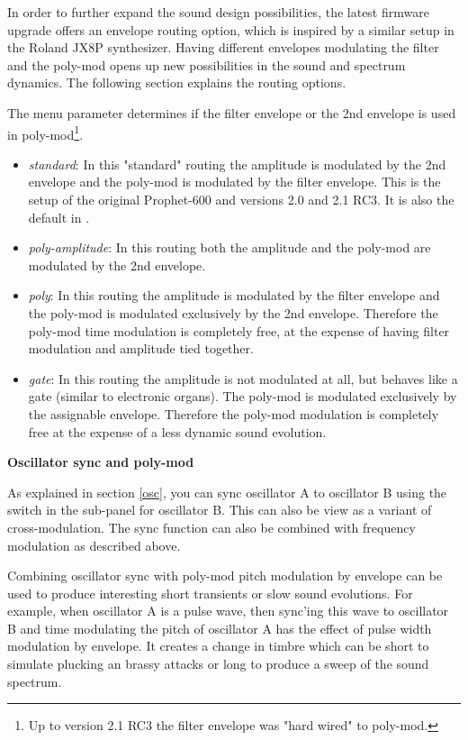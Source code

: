 In order to further expand the sound design possibilities, the latest firmware upgrade offers an envelope routing option, which is inspired by a similar setup in the Roland JX8P synthesizer. Having different envelopes modulating the filter and the poly-mod opens up new possibilities in the sound and spectrum dynamics. The following section explains the routing options. 

The menu parameter \envrouting determines if the filter envelope or the 2nd envelope is used in poly-mod\footnote{Up to version 2.1 RC3 the filter envelope was "hard wired" to poly-mod.}.

\begin{itemize}
  \setlength\itemsep{0cm}
  \item \textit{standard}: In this "standard" routing the amplitude is modulated by the 2nd envelope and the poly-mod is modulated by the filter envelope. This is the setup of the original Prophet-600 and versions 2.0 and 2.1 RC3. It is also the default in \version.
  \item \textit{poly-amplitude}: In this routing both the amplitude and the poly-mod are modulated by the 2nd envelope. 
  \item \textit{poly}: In this routing the amplitude is modulated by the filter envelope and the poly-mod is modulated exclusively by the 2nd envelope. Therefore the poly-mod time modulation is completely free, at the expense of having filter modulation and amplitude tied together.
  \item \textit{gate}: In this routing the amplitude is not modulated at all, but behaves like a gate (similar to electronic organs). The poly-mod is modulated exclusively by the assignable envelope. Therefore the poly-mod modulation is completely free at the expense of a less dynamic sound evolution.
\end{itemize}  


\textbf{Oscillator sync and poly-mod}

As explained in section \ref{osc}, you can sync oscillator A to oscillator B using the \oscsync switch in the sub-panel for oscillator B. This can also be view as a variant of cross-modulation. The sync function can also be combined with frequency modulation as described above. 

Combining oscillator sync with poly-mod pitch modulation by envelope can be used to produce interesting short transients or slow sound evolutions. For example, when oscillator A is a pulse wave, then sync'ing this wave to oscillator B and time modulating the pitch of oscillator A has the effect of pulse width modulation by envelope. It creates a change in timbre which can be short to simulate plucking an brassy attacks or long to produce a sweep of the sound spectrum.

